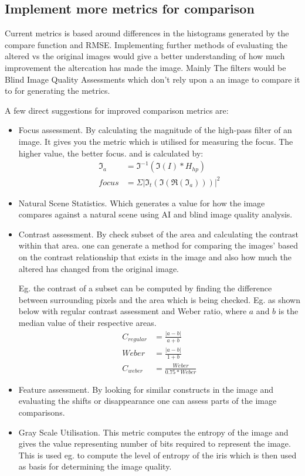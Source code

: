 \subsection{Implement more metrics for comparison}
Current metrics is based around differences in the histograms generated by the
compare function and RMSE.  Implementing further methods of evaluating the
altered vs the original images would give a better understanding of how much
improvement the altercation has made the image. Mainly The filters would be
Blind Image Quality Assessments which don't rely upon a an image to compare it
to for generating the metrics.

A few direct suggestions for improved comparison metrics are:
\begin{itemize}
	\item Focus assessment.  By calculating the magnitude of the high-pass filter
		of an image. It gives you the metric which is utilised for measuring the
		focus.  The higher value, the better focus. and is calculated by:
		\begin{align}
			\Im_a &= \Im^{-1}(\Im(I) * H_{hp}) \\
			focus &= \Sigma | \Im_t( \Im( \Re(\Im_a) ) )|^2
		\end{align}

	\item Natural Scene Statistics.  Which generates a value for how the image
		compares against a natural scene using AI and blind image quality analysis.

	\item Contrast assessment.  By check subset of the area and calculating the
		contrast within that area. one can generate a method for comparing the
		images' based on the contrast relationship that exists in the image and also
		how much the altered has changed from the original image.

		Eg. the contrast of a subset can be computed by finding the difference
		between surrounding pixels and the area which is being checked. Eg. as shown
		below with regular contrast assessment and Weber ratio, where $a$ and $b$ is
		the median value of their respective areas.
		\begin{align}
			C_{regular} &= \frac{|a-b|}{a+b} 		\\
			Weber			&= \frac{|a-b|}{1+b} 			\\
			C_{weber} &= \frac{Weber}{0.75*Weber }
		\end{align}

	\item Feature assessment. By looking for similar constructs in the image and
		evaluating the shifts or disappearance one can assess parts of the image
		comparisons.

	\item Gray Scale Utilisation. This metric computes the entropy of the image
		and gives the value representing number of bits required to represent the
		image. This is used eg. to compute the level of entropy of the iris which
		is then used as basis for determining the image quality.
\end{itemize}



